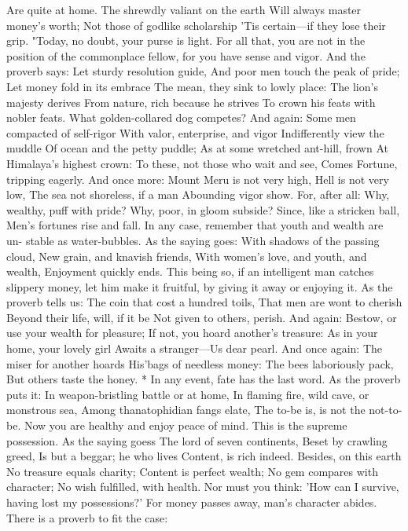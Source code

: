\documentclass{book}
\begin{document}
Are quite at home.
The shrewdly valiant on the earth
Will always master money's worth;
Not those of godlike scholarship
'Tis certain---if they lose their grip.
"Today, no doubt, your purse is light. For all
that, you are not in the position of the commonplace
fellow, for you have sense and vigor. And the proverb
says:
Let sturdy resolution guide,
And poor men touch the peak of pride;
Let money fold in its embrace
The mean, they sink to lowly place:
The lion's majesty derives
From nature, rich because he strives
To crown his feats with nobler feats.
What golden-collared dog competes?
And again:
Some men compacted of self-rigor
With valor, enterprise, and vigor
Indifferently view the muddle
Of ocean and the petty puddle;
As at some wretched ant-hill, frown
At Himalaya's highest crown:
To these, not those who wait and see,
Comes Fortune, tripping eagerly.
And once more:
Mount Meru is not very high,
Hell is not very low,
The sea not shoreless, if a man
Abounding vigor show.
For, after all:
Why, wealthy, puff with pride?
Why, poor, in gloom subside?
Since, like a stricken ball,
Men's fortunes rise and fall.
In any case, remember that youth and wealth are un-
stable as water-bubbles. As the saying goes:
With shadows of the passing cloud,
New grain, and knavish friends,
With women's love, and youth, and wealth,
Enjoyment quickly ends.
This being so, if an intelligent man catches slippery
money, let him make it fruitful, by giving it away or
enjoying it. As the proverb tells us:
The coin that cost a hundred toils,
That men are wont to cherish
Beyond their life, will, if it be
Not given to others, perish.
And again:
Bestow, or use your wealth for pleasure;
If not, you hoard another's treasure:
As in your home, your lovely girl
Awaits a stranger---Us dear pearl.
And once again:
The miser for another hoards
His'bags of needless money:
The bees laboriously pack,
But others taste the honey.    *
In any event, fate has the last word. As the proverb
puts it:
In weapon-bristling battle or at home,
In flaming fire, wild cave, or monstrous sea,
Among thanatophidian fangs elate,
The to-be is, is not the not-to-be.
Now you are healthy and enjoy peace of mind. This
is the supreme possession. As the saying goess
The lord of seven continents,
Beset by crawling greed,
Is but a beggar; he who lives
Content, is rich indeed.
Besides, on this earth
No treasure equals charity;
Content is perfect wealth;
No gem compares with character;
No wish fulfilled, with health.
Nor must you think: 'How can I survive, having lost
my possessions?' For money passes away, man's
character abides. There is a proverb to fit the case:
\end{document}
